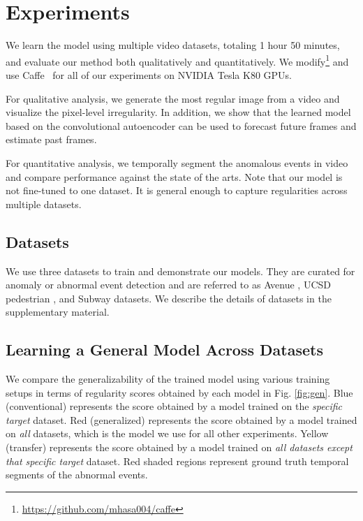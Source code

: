\documentclass[10pt,twocolumn,letterpaper]{article}
\begin{document}
\section{Experiments}
\label{sec:exp}

We learn the model using multiple video datasets, totaling 1 hour 50 minutes, and evaluate our method both qualitatively and quantitatively.
We modify\footnote{\url{https://github.com/mhasa004/caffe}} and use Caffe~\cite{caffe14} for all of our experiments on NVIDIA Tesla K80 GPUs.

For qualitative analysis, we generate the most regular image from a video and visualize the pixel-level irregularity.
In addition, we show that the learned model based on the convolutional autoencoder can be used to forecast future frames and estimate past frames.


For quantitative analysis, we temporally segment the anomalous events in video and compare performance against the state of the arts.
Note that our model is not fine-tuned to one dataset. It is general enough to capture regularities across multiple datasets.

\subsection{Datasets}

We use three datasets to train and demonstrate our models.
They are curated for anomaly or abnormal event detection and are referred to as Avenue \cite{lu2013abnormal}, UCSD pedestrian \cite{mahadevan2010anomaly}, and Subway \cite{adam2008robust} datasets.
We describe the details of datasets in the supplementary material.





\subsection{Learning a General Model Across Datasets}

We compare the generalizability of the trained model using various training setups in terms of regularity scores obtained by each model in Fig. \ref{fig:gen}.
Blue (conventional) represents the score obtained by a model trained on the \emph{specific target} dataset.
Red (generalized) represents the score obtained by a model trained on \emph{all} datasets, which is the model we use for all other experiments.
Yellow (transfer) represents the score obtained by a model trained on \emph{all datasets except that specific target} dataset.
 Red shaded regions represent ground truth temporal segments of the abnormal events.
\end{document}
